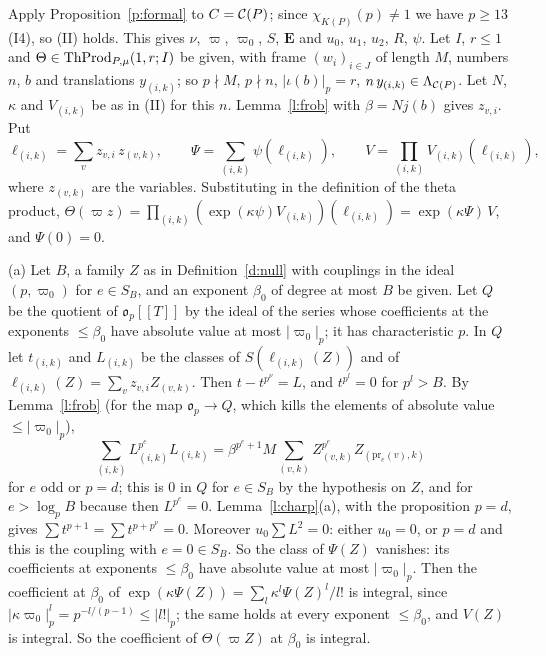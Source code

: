 \documentclass[11pt,a4paper]{article}
\makeatletter
\theoremstyle{plainx}
\theoremstyle{uprightx}
\renewenvironment{proof}[1][Proof]{\par\pushQED{\qed}\normalfont\topsep0pt\partopsep0pt
  \trivlist\item[\hskip\labelsep\itshape #1.]\ignorespaces}{\popQED\endtrivlist\@endpefalse}
\newcommand{\op}{\mathfrak{o}_p}
\newcommand{\np}[1]{|#1|_p}
\newcommand{\KP}[1]{K(#1)}
\newcommand{\chiK}[1]{\chi_{\KP{#1}}}
\newcommand{\LamC}[1]{\Lambda_{#1}}
\makeatother
\begin{document}
\begin{proof}[Proof of Theorem D]
Apply Proposition~\ref{p:formal} to $C=\mathcal{C}(P)$; since $\chiK{P}(p)\ne1$ we have $p\ge13$ (I4), so (II) holds. This
gives $\nu$, $\varpi$, $\varpi_0$, $S$, $\mathbf{E}$ and $u_0$, $u_1$, $u_2$, $R$, $\psi$. Let $I$, $r\le1$ and
$\Theta\in\mathrm{ThProd}_{P,\mu}(1,r;I)$ be given, with frame $(w_i)_{i\in J}$ of length $M$, numbers $n$, $b$ and
translations $y_{(i,k)}$; so $p\nmid M$, $p\nmid n$, $\np{\iota(b)}=r$, $n\,y_{(i,k)}\in\LamC{\cmE{P}}$. Let $N$, $\kappa$
and $V_{(i,k)}$ be as in (II) for this $n$. Lemma~\ref{l:frob} with $\beta=Nj(b)$ gives $z_{v,i}$. Put
\[\ell_{(i,k)}=\sum_vz_{v,i}\,z_{(v,k)},\qquad\Psi=\sum_{(i,k)}\psi(\ell_{(i,k)}),\qquad V=\prod_{(i,k)}V_{(i,k)}(\ell_{(i,k)}) ,\]
where $z_{(v,k)}$ are the variables. Substituting in the definition of the theta product,
$\Theta(\varpi z)=\prod_{(i,k)}(\exp(\kappa\psi)V_{(i,k)})(\ell_{(i,k)})=\exp(\kappa\Psi)\,V$, and $\Psi(0)=0$.

(a) Let $B$, a family $Z$ as in Definition~\ref{d:null} with couplings in the ideal $(p,\varpi_0)$ for $e\in S_B$, and
an exponent $\beta_0$ of degree at most $B$ be given. Let $Q$ be the quotient of $\op[[T]]$ by the ideal of the
series whose coefficients at the exponents $\le\beta_0$ have absolute value at most $\np{\varpi_0}$; it has
characteristic $p$. In $Q$ let $t_{(i,k)}$ and $L_{(i,k)}$ be the classes of $S(\ell_{(i,k)}(Z))$ and of
$\ell_{(i,k)}(Z)=\sum_vz_{v,i}Z_{(v,k)}$. Then $t-t^{p^\nu}=L$, and $t^{p^l}=0$ for $p^l>B$. By Lemma~\ref{l:frob}
(for the map $\op\to Q$, which kills the elements of absolute value $\le\np{\varpi_0}$),
\[\sum_{(i,k)}L_{(i,k)}^{p^e}L_{(i,k)}=\beta^{p^e+1}M\sum_{(v,k)}Z_{(v,k)}^{p^e}Z_{(\mathrm{pr}_e(v),k)}\]
for $e$ odd or $p=d$; this is $0$ in $Q$ for $e\in S_B$ by the hypothesis on $Z$, and for $e>\log_pB$ because
then $L^{p^e}=0$. Lemma~\ref{l:charp}(a), with the proposition $p=d$, gives $\sum t^{p+1}=\sum t^{p+p^\nu}=0$.
Moreover $u_0\sum L^2=0$: either $u_0=0$, or $p=d$ and this is the coupling with $e=0\in S_B$. So the class of
$\Psi(Z)$ vanishes: its coefficients at exponents $\le\beta_0$ have absolute value at most $\np{\varpi_0}$. Then the
coefficient at $\beta_0$ of $\exp(\kappa\Psi(Z))=\sum_l\kappa^l\Psi(Z)^l/l!$ is integral, since
$\np{\kappa\varpi_0}^l=p^{-l/(p-1)}\le\np{l!}$; the same holds at every exponent $\le\beta_0$, and $V(Z)$ is integral. So
the coefficient of $\Theta(\varpi Z)$ at $\beta_0$ is integral.


\end{proof}
\end{document}
